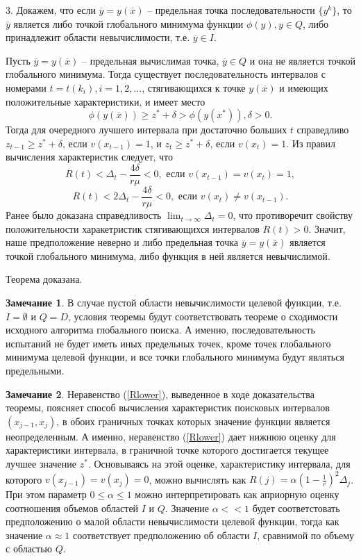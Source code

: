 \documentclass[10pt,a4paper]{book}
\begin{document}
3. Докажем, что если $\overline{y} = y(\overline{x})$ -- предельная точка последовательности $\{y^k\}$, то $\overline{y}$ является либо точкой глобального минимума функции $\phi(y), y \in Q$, либо принадлежит области невычислимости, т.е. $\overline{y} \in I$.

Пусть $\overline{y} = y(\overline{x})$ -- предельная вычислимая точка, $\overline{y} \in Q$ и она не является точкой глобального минимума.
Тогда существует последовательность интервалов с номерами $t = t(k_i), i = 1, 2, ...$, стягивающихся к точке $y(\overline{x})$ и имеющих положительные характеристики, и имеет место
\[
\phi(y(\overline{x})) \geq z^* + \delta > \phi(y(x^*)), \delta > 0.
\]
Тогда для очередного лучшего интервала при достаточно больших $t$ справедливо $z_{t-1} \geq z^* + \delta$, если $v(x_{t-1}) = 1$, и $z_{t} \geq z^* + \delta$, если $v(x_{t}) = 1$. 
Из правил вычисления характеристик следует, что 
\[
R(t) < \Delta_t-\frac{4\delta}{r\mu} < 0, \text{ если } v(x_{t-1}) = v(x_{t}) = 1,
\]
\[
R(t) < 2\Delta_t-\frac{4\delta}{r\mu} < 0, \text{ если } v(x_{t}) \neq v(x_{t-1}).
\]
Ранее было доказана справедливость $\lim_{t \to \infty}{\Delta_t} = 0$, что противоречит свойству положительности харакетристик стягивающихся интервалов $R(t) > 0$. Значит, наше предположение неверно и либо предельная точка $\overline{y} = y(\overline{x})$ является точкой глобального минимума, либо функция в ней является невычислимой. 

Теорема доказана.

\textbf{Замечание 1}. В случае пустой области невычислимости целевой функции, т.е. $I = \emptyset$ и $Q = D$, условия теоремы будут соответствовать теореме о сходимости исходного алгоритма глобального поиска. А именно, последовательность испытаний не будет иметь иных предельных точек, кроме точек глобального минимума целевой функции, и все точки глобального минимума будут являться предельными. 

\textbf{Замечание 2}. Неравенство (\ref{Rlower}), выведенное в ходе доказательства теоремы, поясняет способ вычисления характеристик поисковых интервалов $(x_{j-1}, x_{j})$, в обоих граничных точках которых значение функции является неопределенным. А именно, неравенство (\ref{Rlower}) дает нижнюю оценку для характеристики интервала, в граничной точке которого достигается текущее лучшее значение $z^*$. Основываясь на этой оценке, характеристику интервала, для которого $v(x_{j-1}) = v(x_{j}) = 0$, можно вычислять как $R(j) = \alpha {(1-\frac{1}{r})}^2 \Delta_j $.  При этом параметр $ 0 \leq \alpha \leq 1$ можно интерпретировать как априорную оценку соотношения объемов областей $I$ и $Q$. Значение $\alpha << 1$ будет соответстовать предположению о малой области невычислимости целевой функции, тогда как значение $\alpha \approx 1$ соответствует предположению об области $I$, сравнимой по объему с областью $Q$.
\end{document}
